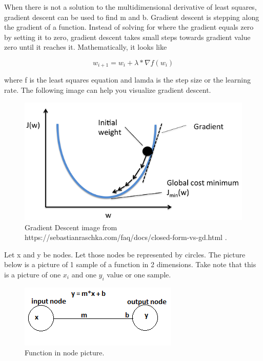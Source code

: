 \documentclass[12pt, oneside]{book}
\begin{document}
When there is not a solution to the multidimensional derivative of least squares, gradient descent can be used to find m and b. Gradient descent is stepping along the gradient of a function. Instead of solving for where the gradient equals zero by setting it to zero, gradient descent takes small steps towards gradient value zero until it reaches it. Mathematically, it looks like

\begin{equation}
w_{i+1} = w_{i} + \lambda * \nabla f(w_{i})
\end{equation}

where f is the least squares equation and lamda is the step size or the learning rate. The following image can help you visualize gradient descent. \cite{lazyprogrammer.me_data_nodate-1}
\begin{figure}[H]
	\centering
	\includegraphics[]{gradDesc.png}
	\caption{Gradient Descent image from https://sebastianraschka.com/faq/docs/closed-form-vs-gd.html \cite{noauthor_machine_nodate}.}
	\label{fig:gradDesc}
\end{figure}

Let x and y be nodes. Let those nodes be represented by circles. The picture below is a picture of 1 sample of a function in 2 dimensions. Take note that this is a picture of one \(x_{i}\) and one \(y_{i}\) value or one sample. 
\begin{figure}[H]
	\centering
	\includegraphics[]{lineNodes.png}
	\caption{Function in node picture.}
	\label{fig:lineNode}
\end{figure}
\end{document}
